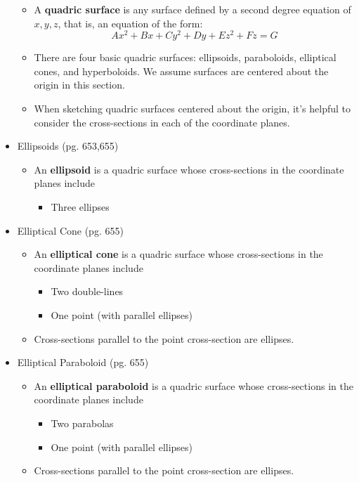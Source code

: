 \documentclass[12pt]{article}
\theoremstyle{plain}
\theoremstyle{definition}
\theoremstyle{remark}
\begin{document}
\begin{itemize}
	\begin{itemize}
	\item A \textbf{quadric surface} is any surface defined by a second degree equation of $x,y,z$, that is, an equation of the form: \[Ax^2+Bx+Cy^2+Dy+Ez^2+Fz=G\]
	\item There are four basic quadric surfaces: ellipsoids, paraboloids, elliptical cones, and hyperboloids. We assume surfaces are centered about the origin in this section.
	\item When sketching quadric surfaces centered about the origin, it's helpful to consider the cross-sections in each of the coordinate planes.
	\end{itemize}
\newpage
\item Ellipsoids (pg. 653,655)
	\begin{itemize}
	\item An \textbf{ellipsoid} is a quadric surface whose cross-sections in the coordinate planes include
		\begin{itemize}
		\item Three ellipses
		\end{itemize}
	\end{itemize}
\item Elliptical Cone (pg. 655)
	\begin{itemize}
	\item An \textbf{elliptical cone} is a quadric surface whose cross-sections in the coordinate planes include
		\begin{itemize}
		\item Two double-lines
		\item One point (with parallel ellipses)
		\end{itemize}
	\item Cross-sections parallel to the point cross-section are ellipses.
	\end{itemize}
\item Elliptical Paraboloid (pg. 655)
	\begin{itemize}
	\item An \textbf{elliptical paraboloid} is a quadric surface whose cross-sections in the coordinate planes include
		\begin{itemize}
		\item Two parabolas
		\item One point (with parallel ellipses)
		\end{itemize}
	\item Cross-sections parallel to the point cross-section are ellipses.
	\end{itemize}

\end{itemize}
\end{document}
